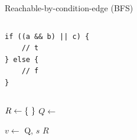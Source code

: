 \documentclass[xcolor = {dvipsnames, table}, aspectratio=169]{beamer}
\begin{document}
\newcommand{\includegraph}[2]{%
    \noindent\includegraphics<#1>[
        width  = \textwidth,
        height = 0.8\textheight,
        keepaspectratio,
    ]{graph/#2.pdf}%
}

\begin{frame}
    Reachable-by-condition-edge (BFS)
\end{frame}

\begin{frame}[fragile]
    \begin{columns}
        \begin{column}{0.4\textwidth}
            \begin{lstlisting}[basicstyle = \footnotesize\ttfamily]
if ((a && b) || c) {
    // t
} else {
    // f
}
            \end{lstlisting}
        \end{column}

    \end{columns}
\end{frame}

\begin{frame}
    \begin{algorithmic}[1]
            \State $R \gets \set{}$
            \State $Q \gets$ 

            \Repeat
                \State $v \gets$ 
                    \State {} {Q, $s$}
                    \State {}
                \EndFor
            \State \Return $R$
        \EndFunction
    \end{algorithmic}
\end{frame}
\end{document}
